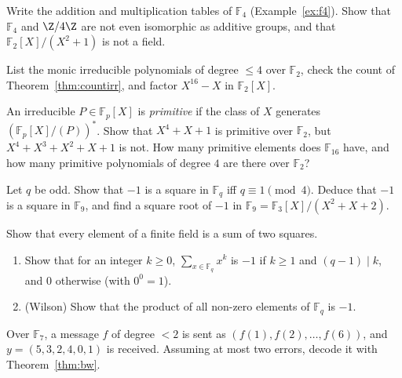 \begin{exercise}[$\star$]\label{ex:f4tables}
Write the addition and multiplication tables of $\mathbb F_4$ (Example~\ref{ex:f4}). Show that $\mathbb F_4$ and $\Z/4\Z$ are not even isomorphic as additive groups, and that $\mathbb F_2[X]/(X^2+1)$ is not a field.
\end{exercise}

\begin{exercise}[$\star$]\label{ex:irrF2}
List the monic irreducible polynomials of degree $\le4$ over $\mathbb F_2$, check the count of Theorem~\ref{thm:countirr}, and factor $X^{16}-X$ in $\mathbb F_2[X]$.
\end{exercise}

\begin{exercise}[$\star\star$]\label{ex:primpoly}
An irreducible $P\in\mathbb F_p[X]$ is \emph{primitive} if the class of $X$ generates $(\mathbb F_p[X]/(P))^*$. Show that $X^4+X+1$ is primitive over $\mathbb F_2$, but $X^4+X^3+X^2+X+1$ is not. How many primitive elements does $\mathbb F_{16}$ have, and how many primitive polynomials of degree $4$ are there over $\mathbb F_2$?
\end{exercise}

\begin{exercise}[$\star\star$]\label{ex:minus1}
Let $q$ be odd. Show that $-1$ is a square in $\mathbb F_q$ iff $q\equiv1\pmod4$. Deduce that $-1$ is a square in $\mathbb F_9$, and find a square root of $-1$ in $\mathbb F_9=\mathbb F_3[X]/(X^2+X+2)$.
\end{exercise}

\begin{exercise}[$\star\star$]\label{ex:twosq}
Show that every element of a finite field is a sum of two squares.
\end{exercise}

\begin{exercise}[$\star\star$]\label{ex:powersums}
\begin{enumerate}[label=(\alph*)]
\item Show that for an integer $k\ge0$, $\displaystyle\sum_{x\in\mathbb F_q}x^k$ is $-1$ if $k\ge1$ and $(q-1)\mid k$, and $0$ otherwise (with $0^0=1$).
\item (Wilson) Show that the product of all non-zero elements of $\mathbb F_q$ is $-1$.
\end{enumerate}
\end{exercise}

\begin{exercise}[$\star\star$]\label{ex:rs7}
Over $\mathbb F_7$, a message $f$ of degree $<2$ is sent as $(f(1),f(2),\dots,f(6))$, and $y=(5,3,2,4,0,1)$ is received. Assuming at most two errors, decode it with Theorem~\ref{thm:bw}.
\end{exercise}

